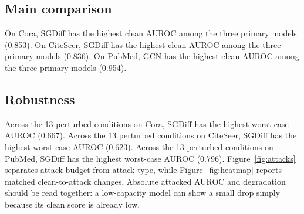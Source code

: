 \subsection{Main comparison}
On Cora, SGDiff has the highest clean AUROC among the three primary models (0.853). On CiteSeer, SGDiff has the highest clean AUROC among the three primary models (0.836). On PubMed, GCN has the highest clean AUROC among the three primary models (0.954).

\subsection{Robustness}
Across the 13 perturbed conditions on Cora, SGDiff has the highest worst-case AUROC (0.667). Across the 13 perturbed conditions on CiteSeer, SGDiff has the highest worst-case AUROC (0.623). Across the 13 perturbed conditions on PubMed, SGDiff has the highest worst-case AUROC (0.796).
Figure~\ref{fig:attacks} separates attack budget from attack type, while Figure~\ref{fig:heatmap} reports matched clean-to-attack changes. Absolute attacked AUROC and degradation should be read together: a low-capacity model can show a small drop simply because its clean score is already low.
